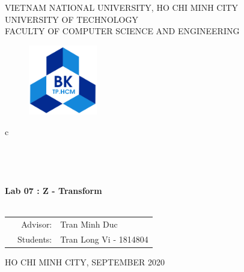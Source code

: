 \documentclass[13pt,a4paper]{article}
\begin{document}
	
	\begin{titlepage}
		\begin{center}
			VIETNAM NATIONAL UNIVERSITY, HO CHI MINH CITY \\
			UNIVERSITY OF TECHNOLOGY \\
			FACULTY OF COMPUTER SCIENCE AND ENGINEERING
		\end{center}
		
		\vspace{1cm}
		
		\begin{figure}[h!]
			\begin{center}
				\includegraphics[width=3cm]{hcmut.png}
			\end{center}
		\end{figure}
		
		\vspace{1cm}
		
		\begin{center}
			\color{blue}
			\begin{tabular}{c}
				\\
				~~\\
				\hline
				\\
				\\
				\\
				\textbf{{\Huge Lab 07 : Z - Transform}}\\
				\\
				\hline
			\end{tabular}
			\color{blue}
		\end{center}
		\vspace{1cm}
		
		\begin{table}[h]
			\color{blue}
			\begin{tabular}{rrl}
				\hspace{5 cm} & Advisor: & Tran Minh Duc\\
				& Students: & Tran Long Vi - 1814804 \\
			\end{tabular}
			\color{blue}
		\end{table}
		
		\vspace{4 cm}
		\begin{center}
			{\footnotesize\large HO CHI MINH CITY, SEPTEMBER 2020}
		\end{center}
	\end{titlepage}
	
\end{document}
